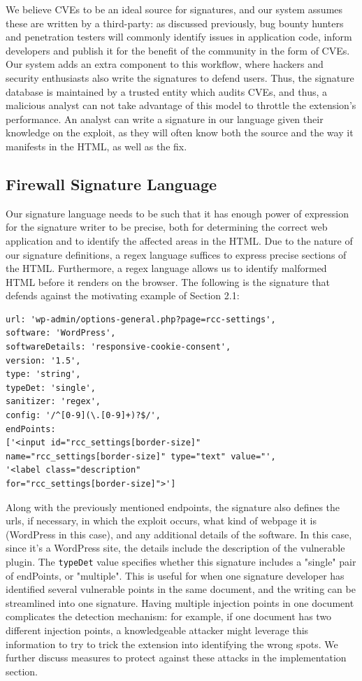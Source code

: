 	 We believe CVEs to be an ideal source for signatures, and our system assumes these are written by a third-party: as discussed previously, bug bounty hunters and penetration testers will commonly identify issues in application code, inform developers and publish it for the benefit of the community in the form of CVEs. Our system adds an extra component to this workflow, where hackers and security enthusiasts also write the signatures to defend users. Thus, the signature database is maintained by a trusted entity which audits CVEs, and thus, a malicious analyst can not take advantage of this model to throttle the extension's performance. An analyst can write a signature in our language given their knowledge on the exploit, as they will often know both the source and the way it manifests in the HTML, as well as the fix.
 
 \subsection{Firewall Signature Language}
 Our signature language needs to be such that it has enough power of expression for the signature writer to be precise, both for determining the correct web application and to identify the affected areas in the HTML. Due to the nature of our signature definitions, a regex language suffices to express precise sections of the HTML. Furthermore, a regex language allows us to identify malformed HTML before it renders on the browser. The following is the signature that defends against the motivating example of Section 2.1:
 \lstset{basicstyle=\small}
\begin{lstlisting}
url: 'wp-admin/options-general.php?page=rcc-settings',
software: 'WordPress',
softwareDetails: 'responsive-cookie-consent',
version: '1.5',
type: 'string',
typeDet: 'single',
sanitizer: 'regex',
config: '/^[0-9](\.[0-9]+)?$/',
endPoints: 
['<input id="rcc_settings[border-size]" 
name="rcc_settings[border-size]" type="text" value="',
'<label class="description" 
for="rcc_settings[border-size]">']
\end{lstlisting}
 
 Along with the previously mentioned endpoints, the signature also defines the urls, if necessary, in which the exploit occurs, what kind of webpage it is (WordPress in this case), and any additional details of the software. In this case, since it's a WordPress site, the details include the description of the vulnerable plugin. The \texttt{typeDet} value specifies whether this signature includes a "single" pair of endPoints, or "multiple". This is useful for when one signature developer has identified several vulnerable points in the same document, and the writing can be streamlined into one signature. Having multiple injection points in one document complicates the detection mechanism: for example, if one document has two different injection points, a knowledgeable attacker might leverage this information to try to trick the extension into identifying the wrong spots. We further discuss measures to protect against these attacks in the implementation section.
 
